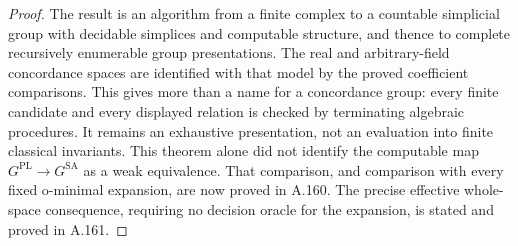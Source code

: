 \begin{proof}
The result is an algorithm from a finite complex to a countable
simplicial group with decidable simplices and computable structure,
and thence to complete recursively enumerable group presentations.
The real and arbitrary-field concordance spaces are identified with
that model by the proved coefficient comparisons. This gives more
than a name for a concordance group: every finite candidate and
every displayed relation is checked by terminating algebraic
procedures. It remains an exhaustive presentation, not an evaluation
into finite classical invariants. This theorem alone did not identify
the computable map $G^{\mathrm{PL}}\to G^{\mathrm{SA}}$ as a weak
equivalence. That comparison, and comparison with every fixed
o-minimal expansion, are now proved in A.160. The precise effective
whole-space consequence, requiring no decision oracle for the
expansion, is stated and proved in A.161.
\end{proof}



